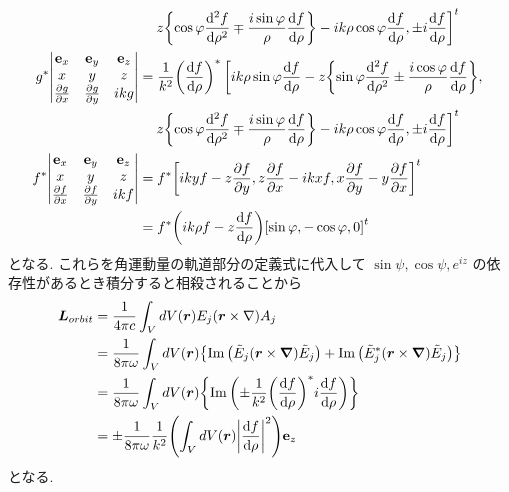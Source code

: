 \documentclass[uplatex,dvipdfmx,a4paper,11pt]{jlreq}
\newcommand{\rr}{\bm{r}}
\newcommand{\Et}{\tilde{E}}
\newcommand{\LL}{\bm{L}}
\theoremstyle{definition}
\begin{document}
\begin{align}
                    & \quad \left. z\qty{\cos\varphi\dv[2]{f}{\rho} \mp \frac{i\sin\varphi}{\rho} \dv{f}{\rho}} - i k\rho\cos\varphi\dv{f}{\rho}, \pm i\dv{f}{\rho}\right]^t                                                                                                                                \\
  g^*\mqty|\vb{e}_x & \vb{e}_y                                                                                                                                                                                                                                                        & \vb{e}_z            \\ x & y & z \\ \pdv{g}{x} & \pdv{g}{y} & i kg |
                    & = \frac{1}{k^2}\qty(\dv{f}{\rho})^*\left[i k\rho\sin\varphi\dv{f}{\rho} - z\qty{\sin\varphi\dv[2]{f}{\rho} \pm \frac{i\cos\varphi}{\rho}\dv{f}{\rho}},\right.                                                                                                                         \\
                    & \quad \left. z\qty{\cos\varphi\dv[2]{f}{\rho} \mp \frac{i\sin\varphi}{\rho} \dv{f}{\rho}} - i k\rho\cos\varphi\dv{f}{\rho}, \pm i\dv{f}{\rho}\right]^t                                                                                                                                \\
  f^*\mqty|\vb{e}_x & \vb{e}_y                                                                                                                                                                                                                                                        & \vb{e}_z            \\ x & y & z \\ \pdv{f}{x} & \pdv{f}{y} & i kf |
                    & = f^* \qty[i kyf - z\pdv{f}{y}, z\pdv{f}{x} - i kxf, x\pdv{f}{y} - y\pdv{f}{x}]^t                                                                                                                                                                                                     \\
                    & = f^* \qty(i k\rho f - z\dv{f}{\rho})\qty[\sin\varphi, -\cos\varphi, 0]^t
\end{align}
となる. これらを角運動量の軌道部分の定義式に代入して $\sin\psi, \cos\psi, e^{i z}$ の依存性があるとき積分すると相殺されることから
\begin{align}
  \LL_{orbit} & = \frac{1}{4\pi c}\int_VdV(\rr)E_j(\rr\times\nabla)A_j                                                                   \\
              & = \frac{1}{8\pi\omega}\int_VdV(\rr)\qty{\Im\qty(\Et_j(\rr\times\vnabla)\Et_j) + \Im\qty(\Et_j^*(\rr\times\vnabla)\Et_j)} \\
              & = \frac{1}{8\pi\omega}\int_VdV(\rr)\qty{\Im\qty(\pm\frac{1}{k^2}\qty(\dv{f}{\rho})^*i\dv{f}{\rho})}                      \\
              & = \pm\frac{1}{8\pi\omega}\frac{1}{k^2}\qty(\int_VdV(\rr)\qty|\dv{f}{\rho}|^2)\vb{e}_z
\end{align}
となる. \\
\end{document}
